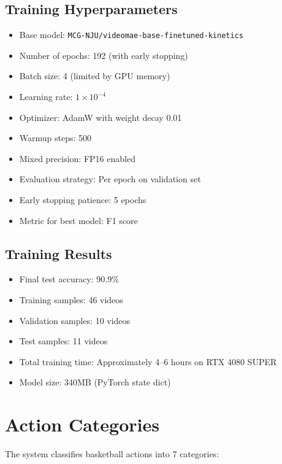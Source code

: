 \subsection{Training Hyperparameters}
\begin{itemize}
    \item Base model: \texttt{MCG-NJU/videomae-base-finetuned-kinetics}
    \item Number of epochs: 192 (with early stopping)
    \item Batch size: 4 (limited by GPU memory)
    \item Learning rate: $1 \times 10^{-4}$
    \item Optimizer: AdamW with weight decay 0.01
    \item Warmup steps: 500
    \item Mixed precision: FP16 enabled
    \item Evaluation strategy: Per epoch on validation set
    \item Early stopping patience: 5 epochs
    \item Metric for best model: F1 score
\end{itemize}

\subsection{Training Results}
\begin{itemize}
    \item Final test accuracy: 90.9\%
    \item Training samples: 46 videos
    \item Validation samples: 10 videos
    \item Test samples: 11 videos
    \item Total training time: Approximately 4--6 hours on RTX 4080 SUPER
    \item Model size: 340MB (PyTorch state dict)
\end{itemize}

\section{Action Categories}
\label{app:actions}

The system classifies basketball actions into 7 categories:

